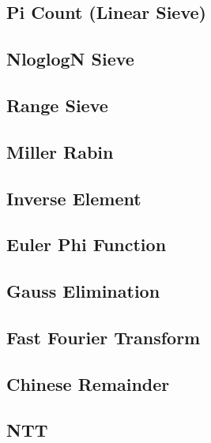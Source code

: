 \documentclass[a4paper,10pt,twocolumn,oneside]{article}
\begin{document}
\subsection{Pi Count (Linear Sieve)}

\subsection{NloglogN Sieve}

\subsection{Range Sieve}

\subsection{Miller Rabin}

\subsection{Inverse Element}

\subsection{Euler Phi Function}

\subsection{Gauss Elimination}

\subsection{Fast Fourier Transform}

\subsection{Chinese Remainder}

%
\subsection{NTT}

\end{document}
